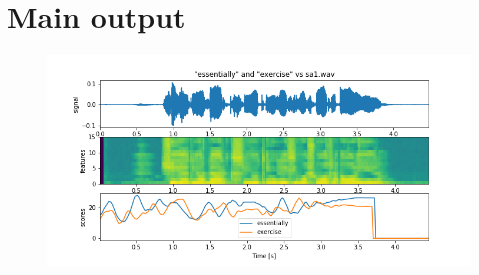 \documentclass[11pt]{article}
\begin{document}
\section{Main output}
\begin{figure}[h]
	\includegraphics[width=\linewidth]{./docs/sa1.png}
\end{figure}
\end{document}
